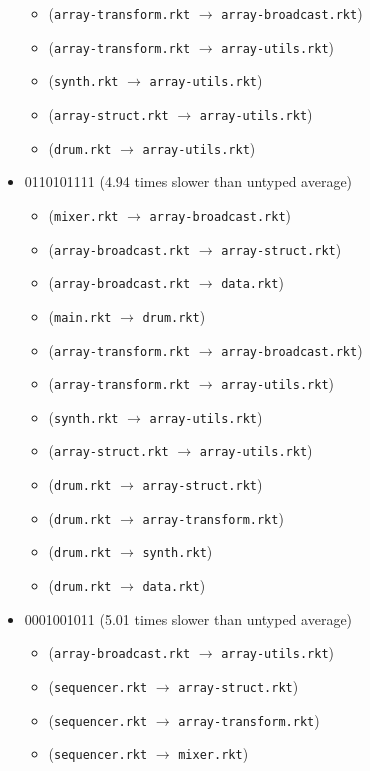 \documentclass{article}
\newcommand{\mono}[1]{\texttt{#1}}
\begin{document}
\begin{itemize}
\begin{itemize}
  \item (\mono{array-transform.rkt} $\rightarrow$ \mono{array-broadcast.rkt})
  \item (\mono{array-transform.rkt} $\rightarrow$ \mono{array-utils.rkt})
  \item (\mono{synth.rkt} $\rightarrow$ \mono{array-utils.rkt})
  \item (\mono{array-struct.rkt} $\rightarrow$ \mono{array-utils.rkt})
  \item (\mono{drum.rkt} $\rightarrow$ \mono{array-utils.rkt})
  \end{itemize}
\item 0110101111 (4.94 times slower than untyped average)
  \begin{itemize}
  \item (\mono{mixer.rkt} $\rightarrow$ \mono{array-broadcast.rkt})
  \item (\mono{array-broadcast.rkt} $\rightarrow$ \mono{array-struct.rkt})
  \item (\mono{array-broadcast.rkt} $\rightarrow$ \mono{data.rkt})
  \item (\mono{main.rkt} $\rightarrow$ \mono{drum.rkt})
  \item (\mono{array-transform.rkt} $\rightarrow$ \mono{array-broadcast.rkt})
  \item (\mono{array-transform.rkt} $\rightarrow$ \mono{array-utils.rkt})
  \item (\mono{synth.rkt} $\rightarrow$ \mono{array-utils.rkt})
  \item (\mono{array-struct.rkt} $\rightarrow$ \mono{array-utils.rkt})
  \item (\mono{drum.rkt} $\rightarrow$ \mono{array-struct.rkt})
  \item (\mono{drum.rkt} $\rightarrow$ \mono{array-transform.rkt})
  \item (\mono{drum.rkt} $\rightarrow$ \mono{synth.rkt})
  \item (\mono{drum.rkt} $\rightarrow$ \mono{data.rkt})
  \end{itemize}
\item 0001001011 (5.01 times slower than untyped average)
  \begin{itemize}
  \item (\mono{array-broadcast.rkt} $\rightarrow$ \mono{array-utils.rkt})
  \item (\mono{sequencer.rkt} $\rightarrow$ \mono{array-struct.rkt})
  \item (\mono{sequencer.rkt} $\rightarrow$ \mono{array-transform.rkt})
  \item (\mono{sequencer.rkt} $\rightarrow$ \mono{mixer.rkt})

\end{itemize}
\end{itemize}
\end{document}
